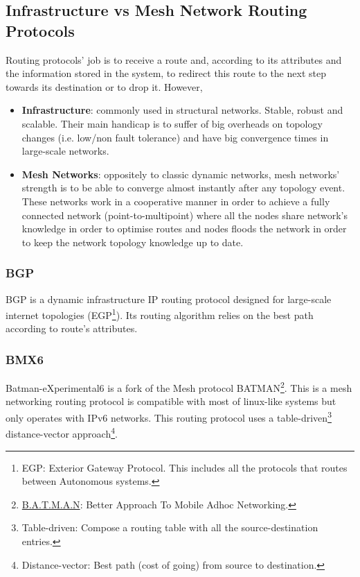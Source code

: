 \subsection{Infrastructure vs Mesh Network Routing Protocols}
\label{subsec:dsrp}
Routing protocols' job is to receive a route and, according to its attributes and the information stored in the system, to redirect this route to the next step towards its destination or to drop it. However, 

\begin{itemize}
    \item \textbf{Infrastructure}: commonly used in structural networks. Stable, robust and scalable. Their main handicap is to suffer of big overheads on topology changes (i.e. low/non fault tolerance) and have big convergence times in large-scale networks.
    \item \textbf{Mesh Networks}: oppositely to classic dynamic networks, mesh networks' strength is to be able to converge almost instantly after any topology event. These networks work in a cooperative manner in order to achieve a fully connected network (point-to-multipoint) where all the nodes share network's knowledge in order to optimise routes and nodes floods the network in order to keep the network topology knowledge up to date.
\end{itemize}

\subsubsection{BGP}
\label{subsubsec:bgp}
BGP is a dynamic infrastructure IP routing protocol designed for large-scale internet topologies (EGP\footnote{EGP: Exterior Gateway Protocol. This includes all the protocols that routes between Autonomous systems.}). Its routing algorithm relies on the best path according to route's attributes.

\subsubsection{BMX6}
\label{subsec:bmx6}
Batman-eXperimental6 \cite{bmx6} is a fork of the Mesh protocol BATMAN\footnote{\href{https://www.open-mesh.org/projects/open-mesh/wiki}{B.A.T.M.A.N}: Better Approach To Mobile Adhoc Networking.}. This is a mesh networking routing protocol is compatible with most of linux-like systems but only operates with IPv6 networks. This routing protocol uses a table-driven\footnote{Table-driven: Compose a routing table with all the source-destination entries.} distance-vector approach\footnote{Distance-vector: Best path (cost of going) from source to destination.}.


